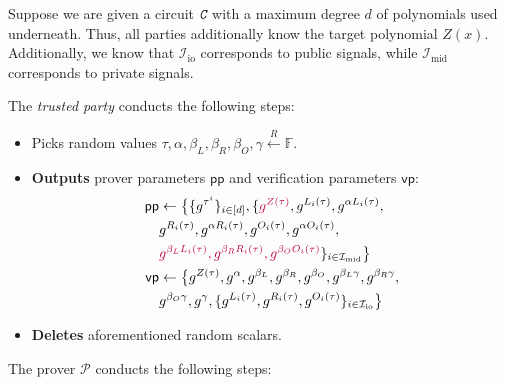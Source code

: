 \documentclass[../lecture-notes.tex]{subfiles}
\begin{document}
\begin{tcolorbox}[breakable, title=Attempt \#5: Turning SNARK into zk-SNARK,
    colback=blue!5!white,
    colframe=blue!75!black,
    colbacktitle=blue!25!white,
    coltitle=blue!20!black,
    fonttitle=\bfseries,
    boxrule=1.25pt,
    subtitle style={boxrule=0pt,
    colback=blue!20!white,
    colupper=blue!75!gray} ]
    \small
    Suppose we are given a circuit $\textit{\texttt{C}}$ with a maximum degree $d$ of polynomials used underneath. Thus, all parties additionally know the target polynomial $Z(x)$. Additionally, we know that $\mathcal{I}_{\text{io}}$ corresponds to public signals, while $\mathcal{I}_{\text{mid}}$ corresponds to private signals.

    The \emph{trusted party} conducts the following steps:
    \begin{itemize}[label=]
        \item Picks random values $\tau, \alpha, \beta_L, \beta_R, \beta_O, \gamma \xleftarrow{R} \mathbb{F}$.
        \item \textbf{Outputs} prover parameters $\mathsf{pp}$ and verification parameters $\mathsf{vp}$:
        \begin{equation*}
            \begin{aligned}
                \mathsf{pp} &\gets \big\{\{g^{\tau^i}\}_{i \in [d]}, \{\textcolor{purple}{g^{Z(\tau)}}, g^{L_i(\tau)}, g^{\alpha L_i(\tau)}, \\ 
                            &  g^{R_i(\tau)}, g^{\alpha R_i(\tau)}, g^{O_i(\tau)}, g^{\alpha O_i(\tau)}, \\
                            & \textcolor{purple}{g^{\beta_LL_i(\tau)}, g^{\beta_RR_i(\tau)}, g^{\beta_OO_i(\tau)}}\}_{i \in \mathcal{I}_{\text{mid}}}\big\} \\
                \mathsf{vp} &\gets \big\{ g^{Z(\tau)}, g^{\alpha}, g^{\beta_L}, g^{\beta_R}, g^{\beta_O}, g^{\beta_L\gamma}, g^{\beta_R\gamma}, \\
                            & g^{\beta_O\gamma}, g^{\gamma}, \{g^{L_i(\tau)}, g^{R_i(\tau)}, g^{O_i(\tau)}\}_{i \in \mathcal{I}_{\text{io}}} \big\}
            \end{aligned}
        \end{equation*}
        \item \textbf{Deletes} aforementioned random scalars.
    \end{itemize}
    The prover $\mathcal{P}$ conducts the following steps:

\end{tcolorbox}
\end{document}
